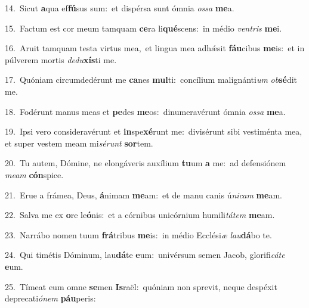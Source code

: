 {\numbfont\textcolor{\numbcolor}{14.}}~Sicut \textbf{a}\-qua ef\-\textbf{fú}\-sus sum:~\star et dispérsa sunt ómnia \textit{os}\-\textit{sa} \textbf{me}\-a.\par
{\numbfont\textcolor{\numbcolor}{15.}}~Factum est cor meum tamquam \textbf{ce}\-ra li\-\textbf{qué}\-scens:~\star in médio \textit{ven}\-\textit{tris} \textbf{me}\-i.\par
{\numbfont\textcolor{\numbcolor}{16.}}~Aruit tamquam testa virtus mea,~\dagger et lingua mea adhǽsit \textbf{fáu}\-cibus \textbf{me}\-is:~\star et in púlverem mortis \textit{de}\-\textit{du}\textbf{xís}ti me.\par
{\numbfont\textcolor{\numbcolor}{17.}}~Quóniam circumdedérunt me \textbf{ca}\-nes \textbf{mul}\-ti:~\star concílium malignánti\textit{um} \textit{ob}\-\textbf{sé}dit me.\par
{\numbfont\textcolor{\numbcolor}{18.}}~Fodérunt manus meas et \textbf{pe}\-des \textbf{me}\-os:~\star dinumeravérunt ómnia \textit{os}\-\textit{sa} \textbf{me}\-a.\par
{\numbfont\textcolor{\numbcolor}{19.}}~Ipsi vero consideravérunt et \textbf{in}\-spe\-\textbf{xé}\-runt me:~\star divisérunt sibi vestiménta mea, et super vestem meam mi\-\textit{sé}\-\textit{runt} \textbf{sor}\-tem.\par
{\numbfont\textcolor{\numbcolor}{20.}}~Tu autem, Dómine, ne elongáveris auxílium \textbf{tu}\-um \textbf{a} me:~\star ad defensiónem \textit{me}\-\textit{am} \textbf{cón}\-spice.\par
{\numbfont\textcolor{\numbcolor}{21.}}~Erue a frámea, Deus, \textbf{á}\-nimam \textbf{me}\-am:~\star et de manu canis ú\-\textit{ni}\-\textit{cam} \textbf{me}\-am.\par
{\numbfont\textcolor{\numbcolor}{22.}}~Salva me ex \textbf{o}\-re le\-\textbf{ó}\-nis:~\star et a córnibus unicórnium humili\-\textit{tá}\-\textit{tem} \textbf{me}\-am.\par
{\numbfont\textcolor{\numbcolor}{23.}}~Narrábo nomen tuum \textbf{frá}\-tribus \textbf{me}\-is:~\star in médio Ecclési\textit{æ} \textit{lau}\-\textbf{dá}bo te.\par
{\numbfont\textcolor{\numbcolor}{24.}}~Qui timétis Dóminum, lau\-\textbf{dá}\-te \textbf{e}\-um:~\star univérsum semen Jacob, glorifi\-\textit{cá}\-\textit{te} \textbf{e}\-um.\par
{\numbfont\textcolor{\numbcolor}{25.}}~Tímeat eum omne \textbf{se}\-men \textbf{Is}\-raël:~\star quóniam non sprevit, neque despéxit deprecati\-\textit{ó}\-\textit{nem} \textbf{páu}\-peris:\par
